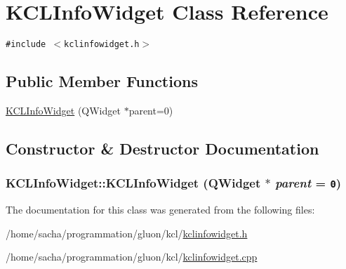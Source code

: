 \hypertarget{class_k_c_l_info_widget}{
\section{KCLInfoWidget Class Reference}
\label{class_k_c_l_info_widget}
}
{\tt \#include $<$kclinfowidget.h$>$}

\subsection*{Public Member Functions}
\begin{CompactItemize}
\item 
\hyperlink{class_k_c_l_info_widget_2114f10ac40847ddafb03d19bebef203}{KCLInfoWidget} (QWidget $\ast$parent=0)
\end{CompactItemize}


\subsection{Constructor \& Destructor Documentation}
\hypertarget{class_k_c_l_info_widget_2114f10ac40847ddafb03d19bebef203}{
\subsubsection[{KCLInfoWidget}]{\setlength{\rightskip}{0pt plus 5cm}KCLInfoWidget::KCLInfoWidget (QWidget $\ast$ {\em parent} = {\tt 0})}}
\label{class_k_c_l_info_widget_2114f10ac40847ddafb03d19bebef203}




The documentation for this class was generated from the following files:\begin{CompactItemize}
\item 
/home/sacha/programmation/gluon/kcl/\hyperlink{kclinfowidget_8h}{kclinfowidget.h}\item 
/home/sacha/programmation/gluon/kcl/\hyperlink{kclinfowidget_8cpp}{kclinfowidget.cpp}\end{CompactItemize}
